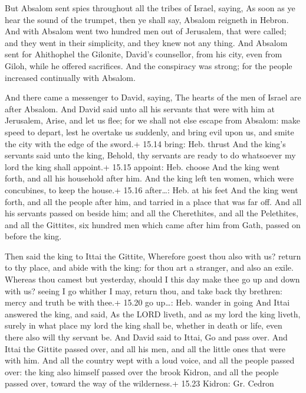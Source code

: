  But Absalom sent spies throughout all the tribes of
Israel, saying, As soon as ye hear the sound of the trumpet, then ye
shall say, Absalom reigneth in Hebron.  And with Absalom
went two hundred men out of Jerusalem, that were called; and they went
in their simplicity, and they knew not any thing.  And
Absalom sent for Ahithophel the Gilonite, David's counsellor, from his
city, even from Giloh, while he offered sacrifices. And the conspiracy
was strong; for the people increased continually with Absalom.

 And there came a messenger to David, saying, The hearts
of the men of Israel are after Absalom.  And David said
unto all his servants that were with him at Jerusalem, Arise, and let us
flee; for we shall not else escape from Absalom: make speed to depart,
lest he overtake us suddenly, and bring evil upon us, and smite the city
with the edge of the sword.+ 15.14 bring: Heb. thrust  And
the king's servants said unto the king, Behold, thy servants are ready
to do whatsoever my lord the king shall appoint.+ 15.15 appoint: Heb.
choose  And the king went forth, and all his household
after him. And the king left ten women, which were concubines, to keep
the house.+ 15.16 after\ldots: Heb. at his feet  And the
king went forth, and all the people after him, and tarried in a place
that was far off.  And all his servants passed on beside
him; and all the Cherethites, and all the Pelethites, and all the
Gittites, six hundred men which came after him from Gath, passed on
before the king.

 Then said the king to Ittai the Gittite, Wherefore goest
thou also with us? return to thy place, and abide with the king: for
thou art a stranger, and also an exile.  Whereas thou
camest but yesterday, should I this day make thee go up and down with
us? seeing I go whither I may, return thou, and take back thy brethren:
mercy and truth be with thee.+ 15.20 go up\ldots: Heb. wander in going
 And Ittai answered the king, and said, As the LORD liveth,
and as my lord the king liveth, surely in what place my lord the king
shall be, whether in death or life, even there also will thy servant be.
 And David said to Ittai, Go and pass over. And Ittai the
Gittite passed over, and all his men, and all the little ones that were
with him.  And all the country wept with a loud voice, and
all the people passed over: the king also himself passed over the brook
Kidron, and all the people passed over, toward the way of the
wilderness.+ 15.23 Kidron: Gr. Cedron

